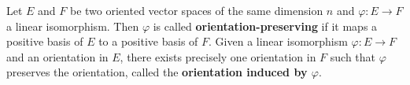 Let $E$ and $F$ be two oriented vector spaces of the same dimension $n$ and $\varphi: E \to F$ a linear isomorphism. Then $\varphi$ is called \textbf{orientation-preserving} if it maps a positive basis of $E$ to a positive basis of $F$.
Given a linear isomorphism $\varphi: E \to F$ and an orientation in $E$, there exists precisely one orientation in $F$ such that $\varphi$ preserves the orientation, called the \textbf{orientation induced by $\varphi$}.
